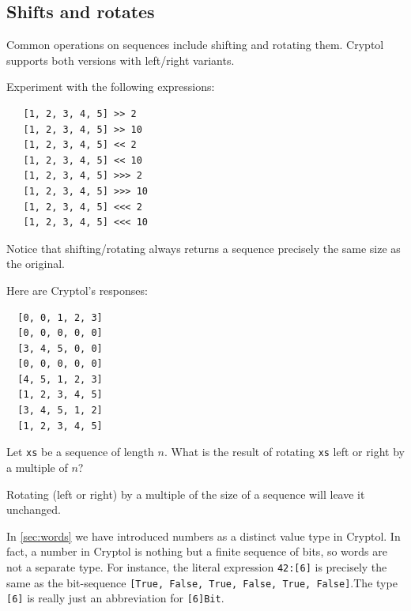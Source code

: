 \subsection{Shifts and rotates}
\label{sec:shifts-rotates}

Common operations on sequences include shifting and rotating them.
Cryptol supports both versions with left/right
variants.\indShiftLeft\indShiftRight\indRotLeft\indRotRight
\begin{Exercise}\label{ex:seq:14}
Experiment with the following expressions:
\begin{Verbatim}
   [1, 2, 3, 4, 5] >> 2
   [1, 2, 3, 4, 5] >> 10
   [1, 2, 3, 4, 5] << 2
   [1, 2, 3, 4, 5] << 10
   [1, 2, 3, 4, 5] >>> 2
   [1, 2, 3, 4, 5] >>> 10
   [1, 2, 3, 4, 5] <<< 2
   [1, 2, 3, 4, 5] <<< 10
\end{Verbatim}
\noindent Notice that shifting/rotating always returns a sequence
precisely the same size as the original.
\end{Exercise}
\begin{Answer}
Here are Cryptol's responses:
\begin{Verbatim}
  [0, 0, 1, 2, 3]
  [0, 0, 0, 0, 0]
  [3, 4, 5, 0, 0]
  [0, 0, 0, 0, 0]
  [4, 5, 1, 2, 3]
  [1, 2, 3, 4, 5]
  [3, 4, 5, 1, 2]
  [1, 2, 3, 4, 5]
\end{Verbatim}
\end{Answer}
\begin{Exercise}\label{ex:seq:15}
  Let {\tt xs} be a sequence of length $n$. What is the result of
  rotating {\tt xs} left or right by a multiple of $n$?
\end{Exercise}
\begin{Answer}
  Rotating (left or right) by a multiple of the size of a sequence
  will leave it unchanged.
\end{Answer}


In \autoref{sec:words} we have introduced numbers as a distinct value
type in Cryptol. In fact, a number in Cryptol is nothing but a finite
sequence of bits, so words are not a separate type. For instance, the
literal expression \texttt{42:[6]} is precisely the same as the
bit-sequence \texttt{[True, False, True, False, True,
    False]}.\indTheWordType The type \texttt{[6]} is really just an
abbreviation for \texttt{[6]Bit}.


